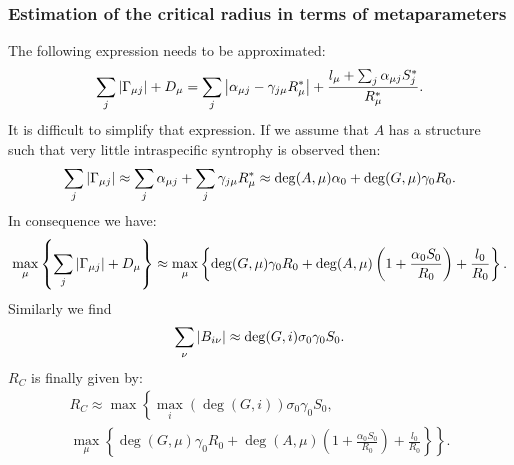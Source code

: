 \documentclass[12pt, titlepage, twoside, openright]{report}
\begin{document}
\subsubsection{Estimation of the critical radius in terms of metaparameters}\label{sec : estimate critical radius parameters}
The following expression needs to be approximated:
\begin{equation}
\sum_j \left|{\Gamma_{\mu j}}\right|+D_\mu = \sum_j \left|{\alpha_{\mu j}-\gamma_{j\mu}R^*_\mu}\right|+\frac{l_\mu+\sum_j\alpha_{\mu j} S^*_j}{R^*_\mu}.
\end{equation}
It is difficult to simplify that expression. If we assume that $A$ has a structure such that very little intraspecific syntrophy is observed then:
\begin{equation}
\sum_j \left|{\Gamma_{\mu j}}\right| \approx \sum_j \alpha_{\mu j}+ \sum_j \gamma_{j\mu}R^*_\mu \approx \deg(A,\mu)\alpha_0+\deg(G,\mu)\gamma_0 R_0.
\end{equation}
In consequence we have:
\begin{equation}
\max_\mu\left\{\sum_j \left|{\Gamma_{\mu j}}\right|+D_\mu\right\} \approx \max_\mu\left\{\deg(G,\mu) \gamma_0 R_0 + \deg(A,\mu)\left(1+\frac{\alpha_0S_0}{R_0}\right)+\frac{l_0}{R_0}\right\}.
\end{equation}
Similarly we find
\begin{equation}
\sum_\nu \left|{B_{i\nu}}\right| \approx \deg(G, i) \sigma_0 \gamma_0 S_0.
\end{equation}
$R_C$ is finally given by:
\begin{multline}
R_C \approx \max\left\{ \max_i\left(\deg(G,i)\right) \sigma_0 \gamma_0 S_0 \right., \\
 \left.\max_\mu\left\{\deg(G,\mu) \gamma_0 R_0 + \deg(A,\mu)\left(1+\frac{\alpha_0S_0}{R_0}\right)+\frac{l_0}{R_0}\right\}\right\}.
\end{multline}
\end{document}
